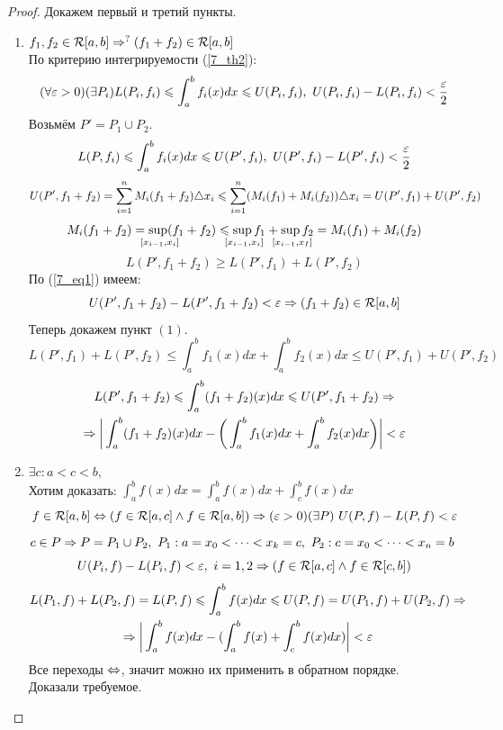\begin{proof}
	Докажем первый и третий пункты.\\
	\begin{enumerate}
	\item $f_1,f_2\in\mathcal R[a,b]\Rightarrow^?(f_1+f_2)\in\mathcal R[a,b]$\\
	По критерию интегрируемости (\ref{7_th2}):
	\[(\forall\eps>0)(\exists P_i)L(P_i,f_i)\le\int_a^bf_i(x)dx\le U(P_i,f_i),\ U(P_i,f_i)-L(P_i,f_i)<\frac\eps2\] 
	Возьмём $P'=P_1\cup P_2$.
	\begin{equation}\label{7_eq1}
		L(P,f_i)\le\int_a^bf_i(x)dx\le U(P',f_i),\ U(P',f_i)-L(P',f_i)<\frac\eps2\\
	\end{equation}
	\[U(P',f_1+f_2)=\sum_{i=1}^nM_i(f_1+f_2)\tr x_i\le\sum_{i=1}^n(M_i(f_1)+M_i(f_2))\tr x_i=U(P',f_1)+U(P',f_2)\]
	\[M_i(f_1+f_2)=\smo{\sup_{\hspace{0.1cm}[x_{i-1},x_i]}}(f_1+f_2)\le\smo{\sup_{\hspace{0.1cm}[x_{i-1},x_i]}}f_1+\smo{\sup_{\hspace{0.1cm}[x_{i-1},x_I]}}f_2=M_i(f_1)+M_i(f_2)\]
	\[L(P',f_1+f_2)\ge L(P',f_1)+L(P',f_2)\]
	По (\ref{7_eq1}) имеем:
	\[U(P',f_1+f_2)-L(P',f_1+f_2)<\varepsilon\Rightarrow (f_1+f_2)\in\mathcal R[a,b]\]
	Теперь докажем пункт $(1)$.\\
	\[L(P',f_1)+L(P',f_2)\le\int_a^bf_1(x)dx+\int_a^bf_2(x)dx\le U(P',f_1)+U(P',f_2)\]
	\begin{multline*}
		L(P',f_1+f_2)\leqslant\int_a^b(f_1+f_2)(x)dx\leqslant U(P',f_1+f_2)\Rightarrow\\
		\Rightarrow\bigg|\int_a^b(f_1+f_2)(x)dx-\bigg(\int_a^bf_1(x)dx+\int_a^bf_2(x)dx\bigg)\bigg|<\varepsilon
	\end{multline*}
	\item[3.] $\exists c: a<c<b,$\\ 
	Хотим доказать: $\displaystyle\int_a^bf(x)dx=\int_a^bf(x)dx+\int_c^bf(x)dx$
	\[f\in\mathcal R[a,b]\Leftrightarrow(f\in\mathcal R[a,c]\land f\in\mathcal R[a,b])\Rightarrow(\varepsilon>0)(\exists P)\ U(P,f)-L(P,f)<\varepsilon\]
	$c\in P\Ra P=P_1\cup P_2,\ P_1:a=x_0<\dots<x_k=c,\ P_2:c=x_0<\dots<x_n=b$\\
	\[U(P_i,f)-L(P_i,f)<\varepsilon,\ i=1,2\Rightarrow (f\in\mathcal R[a,c]\land f\in\mathcal R[c,b])\]
	\begin{multline*}
		L(P_1,f)+L(P_2,f)=L(P,f)\leqslant\int_a^bf(x)dx\leqslant U(P,f)=U(P_1,f)+U(P_2,f)\Rightarrow\\
		\Rightarrow\bigg|\int_a^bf(x)dx-(\int_a^bf(x)+\int_c^bf(x)dx)\bigg|<\varepsilon
	\end{multline*}
	Все переходы $\Leftrightarrow$, значит можно их применить в обратном порядке.\\ 
	Доказали требуемое.
	\end{enumerate}
\end{proof}
